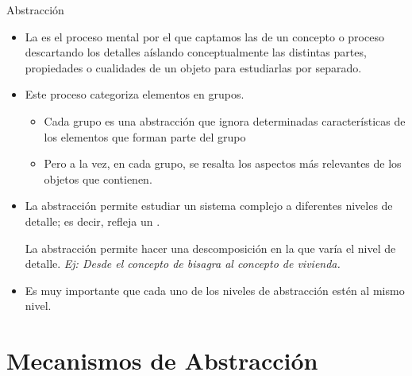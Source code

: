 \documentclass[10pt,envcountsect,spanish]{beamer}
\begin{document}
\begin{frame}{Abstracción}

\begin{itemize}%

\item 
La   es el proceso mental por el que captamos las  de un concepto o proceso descartando los detalles aíslando conceptualmente las distintas partes, propiedades o cualidades de un objeto para estudiarlas por separado. 

\item 
Este proceso categoriza elementos en grupos.  

\begin{itemize}
	\item 
	Cada grupo es una abstracción que ignora determinadas características de los elementos que forman parte del grupo

	\item 
	Pero a la vez, en cada grupo, se resalta los aspectos más relevantes de los objetos que contienen.
\end{itemize}


\item La abstracción permite estudiar un sistema complejo a diferentes niveles de detalle; es decir, refleja un . 

La abstracción permite hacer una descomposición en la que varía el nivel de detalle.
\textit{Ej: Desde el concepto de bisagra al concepto de vivienda.}


\item 
Es muy importante que cada uno de los niveles de abstracción estén al mismo nivel. 
\end{itemize}

\end{frame}




\section{Mecanismos de Abstracción}
\end{document}
